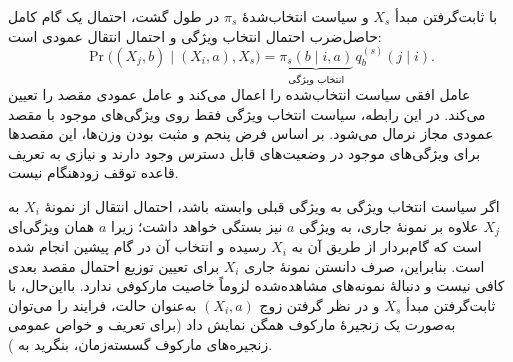 با ثابت‌گرفتن مبدأ $X_s$ و سیاست انتخاب‌شدهٔ $\pi_s$
در طول گشت، احتمال یک گام کامل حاصل‌ضرب
احتمال انتخاب ویژگی و احتمال انتقال عمودی است:
\begin{equation}\label{cmp:eq:ch3-full-transition}
\Pr\bigl((X_j,b)\mid(X_i,a),X_s\bigr)
=\underbrace{\pi_s(b\mid i,a)}_{\text{انتخاب ویژگی}}\,
q_b^{(s)}(j\mid i).
\end{equation}
عامل افقی سیاست انتخاب‌شده را اعمال می‌کند و
عامل عمودی مقصد را تعیین می‌کند.
در این رابطه، سیاست انتخاب ویژگی فقط روی ویژگی‌های موجود با مقصد عمودی مجاز نرمال می‌شود. بر اساس فرض پنجم و مثبت بودن وزن‌ها، این مقصدها برای ویژگی‌های موجود در وضعیت‌های قابل دسترس وجود دارند و نیازی به تعریف قاعده توقف زودهنگام نیست.

اگر سیاست انتخاب ویژگی به ویژگی قبلی وابسته باشد، احتمال انتقال از نمونهٔ $X_i$ به $X_j$ علاوه بر نمونهٔ جاری، به ویژگی $a$ نیز بستگی خواهد داشت؛ زیرا $a$ همان ویژگی‌ای است که گام‌بردار از طریق آن به $X_i$ رسیده و انتخاب آن در گام پیشین انجام شده است. بنابراین، صرف دانستن نمونهٔ جاری $X_i$ برای تعیین توزیع احتمال مقصد بعدی کافی نیست و دنبالهٔ نمونه‌های مشاهده‌شده لزوماً خاصیت مارکوفی ندارد. بااین‌حال، با ثابت‌گرفتن مبدأ $X_s$ و در نظر گرفتن زوج $(X_i,a)$ به‌عنوان حالت، فرایند را می‌توان به‌صورت یک زنجیرهٔ مارکوف همگن نمایش داد (برای تعریف و خواص عمومی زنجیره‌های مارکوف گسسته‌زمان، بنگرید به \cite{Norris1997MarkovChains}).

